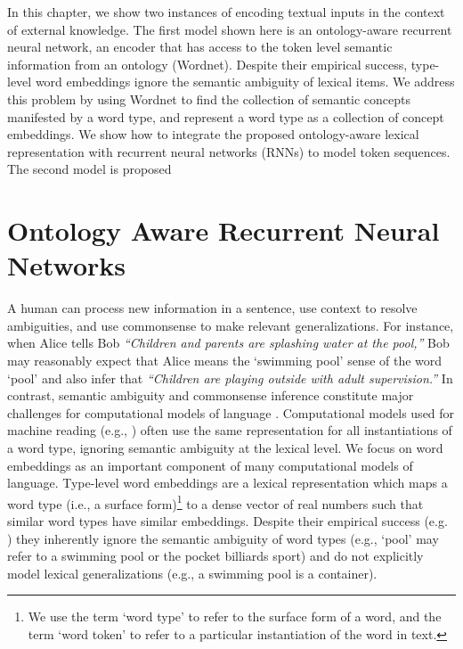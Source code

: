 In this chapter, we show two instances of encoding textual inputs in the context of external knowledge. The first model shown here is an ontology-aware recurrent neural network, an encoder that has access to the token level semantic information from an ontology (Wordnet).
Despite their empirical success, type-level word embeddings ignore the semantic ambiguity of lexical items. We address this problem by using Wordnet to find the collection of semantic concepts manifested by a word type, and represent a word type as a collection of concept embeddings. We show
how to integrate the proposed ontology-aware lexical representation with recurrent neural networks (RNNs) to model token sequences. The second model is proposed 

\section{Ontology Aware Recurrent Neural Networks}
A human can process new information in a sentence, use context to resolve ambiguities, and use commonsense to make relevant generalizations.
For instance, when Alice tells Bob \textit{``Children and parents are splashing water at the pool,''} Bob may reasonably expect that Alice means the `swimming pool' sense of the word `pool' and also infer that \textit{``Children are playing outside with adult supervision.''}
In contrast, semantic ambiguity and commonsense inference constitute major challenges for computational models of language \citep{yarowsky:94,tanaka:07,celikyilmaz:13,pasca:14}.
Computational models used for machine reading (e.g., \cite{bowman:15}) often use the same representation for all instantiations of a word type, ignoring semantic ambiguity at the lexical level.  We focus on word embeddings as an important component of many computational models of language.
Type-level word embeddings are a lexical representation which maps a word type (i.e., a surface form)\footnote{We use the term `word type' to refer to the surface form of a word, and the term `word token' to refer to a particular instantiation of the word in text.} 
to a dense vector of real numbers such that similar word types have similar embeddings. 
Despite their empirical success (e.g. \cite{socher:10}) they inherently ignore the semantic ambiguity of word types (e.g., `pool' may refer to a swimming pool or the pocket billiards sport)  and do not explicitly model lexical generalizations (e.g., a swimming pool is a container).

